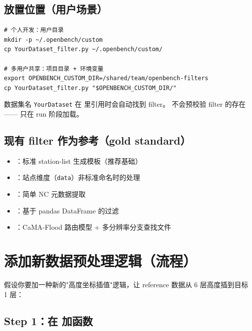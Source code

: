 \subsection{放置位置（用户场景）}

\begin{verbatim}
# 个人开发：用户目录
mkdir -p ~/.openbench/custom
cp YourDataset_filter.py ~/.openbench/custom/

# 多用户共享：项目目录 + 环境变量
export OPENBENCH_CUSTOM_DIR=/shared/team/openbench-filters
cp YourDataset_filter.py "$OPENBENCH_CUSTOM_DIR/"
\end{verbatim}

数据集名 \texttt{YourDataset} 在  里引用时会自动找到 filter。 不会预校验 filter 的存在 —— 只在 run 阶段加载。

\subsection{现有 filter 作为参考（gold standard）}

\begin{itemize}
  \item {}：标准 station-list 生成模板（推荐基础）
  \item {}：站点维度（\texttt{data}）非标准命名时的处理
  \item {}：简单 NC 元数据提取
  \item {}：基于 pandas DataFrame 的过滤
  \item {}：CaMA-Flood 路由模型 + 多分辨率分支查找文件
\end{itemize}


\section{添加新数据预处理逻辑（流程）}

假设你要加一种新的"高度坐标插值"逻辑，让 reference 数据从 6 层高度插到目标 1 层：

\subsection{Step 1：在  加函数}

